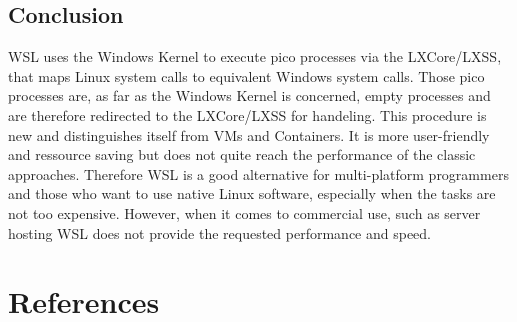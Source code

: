 \documentclass[utf8,biblatex, ngerman, english]{lni}
\begin{document}
\subsection{Conclusion}
WSL uses the Windows Kernel to execute pico processes via the LXCore/LXSS, that maps Linux system calls to equivalent Windows system calls. Those pico processes are, as far as the Windows Kernel is concerned, empty processes and are therefore redirected to the LXCore/LXSS for handeling. This procedure is new and distinguishes itself from VMs and Containers. It is more user-friendly and ressource saving but does not quite reach the performance of the classic approaches. Therefore WSL is a good alternative for multi-platform programmers and those who want to use native Linux software, especially when the tasks are not too expensive. However, when it comes to commercial use, such as server hosting WSL does not provide the requested performance and speed.

\newpage
\section{References}
\printbibliography
\end{document}

